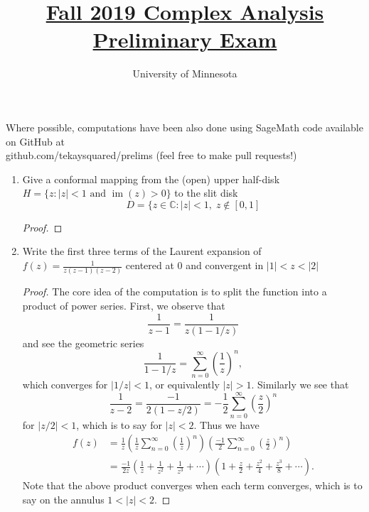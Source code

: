 \documentclass{article}
\title{\href{https://math.umn.edu/sites/math.umn.edu/files/exams/complexf19.pdf}{Fall 2019 Complex Analysis Preliminary Exam}}
\author{University of Minnesota}
\date{}
\DeclareMathOperator{\im}{im}
\begin{document}
\maketitle

Where possible, computations have been also done using SageMath code available on GitHub at \\ github.com/tekaysquared/prelims (feel free to make pull requests!)

\begin{enumerate}
	\item Give a conformal mapping from the (open) upper half-disk $H = \{z : |z|<1 \text{ and } \im(z) > 0\}$ to the slit disk
	\[D = \{ z \in \mathbb{C} : |z|< 1,\;z \not \in [0,1] \]
	

	\begin{proof}
	
	\end{proof}



	\setcounter{enumi}{1}
	
	\item Write the first three terms of the Laurent expansion of $\displaystyle f(z) = \frac{1}{z(z-1)(z-2)}$ centered at $0$ and convergent in $|1| < z < |2|$
	
	\begin{proof}
		The core idea of the computation is to split the function into a product of power series.
		First, we observe that 
		\[ \frac{1}{z-1} = \frac{1}{z(1-1/z)}\] 
		and see the geometric series 
		\[ \frac{1}{1-1/z} = \sum_{n=0}^\infty \left( \frac{1}{z} \right)^n,\]
		which converges for $|1/z| < 1$, or equivalently $|z|>1$.
		Similarly we see that 
		\[ \frac{1}{z-2} = \frac{-1}{2(1-z/2)} = -\frac{1}{2} \sum_{n=0}^\infty \left ( \frac{z}{2} \right )^n \]
		for $|z/2| < 1$, which is to say for $|z|< 2$.
		Thus we have
		\begin{align*}
			f(z) &= \frac{1}{z} \left ( \frac{1}{z} \sum_{n=0}^\infty \left ( \frac{1}{z} \right )^n \right ) \left ( \frac{-1}{2} \sum_{n=0}^\infty \left( \frac{z}{2} \right)^n \right )\\
			&= \frac{-1}{2z} \left (\frac{1}{z} + \frac{1}{z^2} + \frac{1}{z^3} + \cdots  \right) \left ( 1 + \frac{z}{2}+\frac{z^2}{4}+\frac{z^3}{8}+\cdots \right ).
		\end{align*}
		Note that the above product converges when each term converges, which is to say on the annulus $1 < |z| < 2$.
	

\end{proof}
\end{enumerate}
\end{document}
